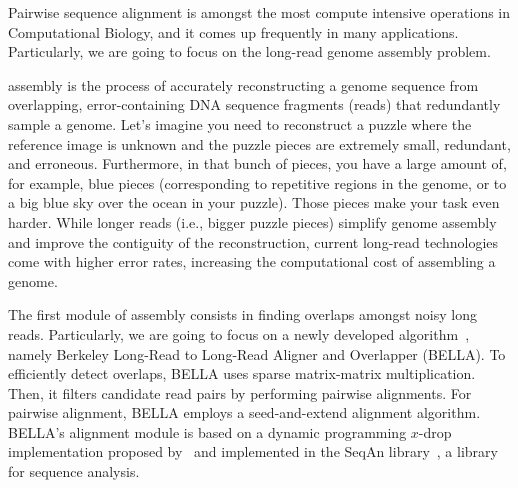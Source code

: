 \justify
Pairwise sequence alignment is amongst the most compute intensive operations in Computational Biology, and it comes up frequently in many applications. 
Particularly, we are going to focus on the \denovo long-read genome assembly problem.

\Denovo assembly is the process of accurately reconstructing a genome sequence from overlapping, error-containing DNA sequence fragments (reads) that redundantly sample a genome. 
Let's imagine you need to reconstruct a puzzle where the reference image is unknown and the puzzle pieces are extremely small, redundant, and erroneous. 
Furthermore, in that bunch of pieces, you have a large amount of, for example, blue pieces (corresponding to repetitive regions in the genome, or to a big blue sky over the ocean in your puzzle).
Those pieces make your task even harder. While longer reads (i.e., bigger puzzle pieces) simplify genome assembly and improve the contiguity of the reconstruction, current long-read technologies come with higher error rates, increasing the computational cost of assembling a genome.

The first module of \denovo assembly consists in finding overlaps amongst noisy long reads.
Particularly, we are going to focus on a newly developed algorithm~\citep{guidi2018bella}, namely Berkeley Long-Read to Long-Read Aligner and Overlapper (BELLA).
To efficiently detect overlaps, BELLA uses sparse matrix-matrix multiplication. 
Then, it filters candidate read pairs by performing pairwise alignments.
For pairwise alignment, BELLA employs a seed-and-extend alignment algorithm. BELLA's alignment module is based on a dynamic programming $x$-drop implementation proposed by~\citet{zhang2000greedy} and implemented in the SeqAn library~\citep{doring2008seqan}, a \CC library for sequence analysis. 

